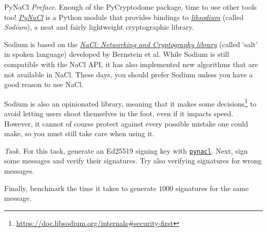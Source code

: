\documentclass{practice}
\begin{document}
\begin{task}{PyNaCl}
  \textit{Preface.}
  Enough of the PyCryptodome package, time to use other tools too!
  \href{https://pynacl.readthedocs.io/en/latest/}{\emph{PyNaCl}} is a Python module that provides bindings to \href{https://doc.libsodium.org}{\emph{libsodium}} (called \emph{Sodium}), a neat and fairly lightweight cryptographic library.
  
  Sodium is based on the \href{http://nacl.cr.yp.to}{\emph{NaCl: Networking and Cryptography library}} (called `salt' in spoken language) developed by Bernstein et al.
  While Sodium is still compatible with the NaCl API, it has also implemented new algorithms that are not available in NaCl.
  These days, you should prefer Sodium unless you have a good reason to use NaCl.

  Sodium is also an opinionated library, meaning that it makes some decisions\footnote{\url{https://doc.libsodium.org/internals\#security-first}} to avoid letting users shoot themselves in the foot, even if it impacts speed.
  However, it cannot of course protect against every possible mistake one could make, so you must still take care when using it.

  \textit{Task.}
  For this task, generate an Ed25519 signing key with \href{https://pynacl.readthedocs.io/en/latest/signing/#}{\texttt{pynacl}}.
  Next, sign some messages and verify their signatures.
  Try also verifying signatures for wrong messages.

  Finally, benchmark the time it takes to generate $1000$ signatures for the same message.
\end{task}
\end{document}
